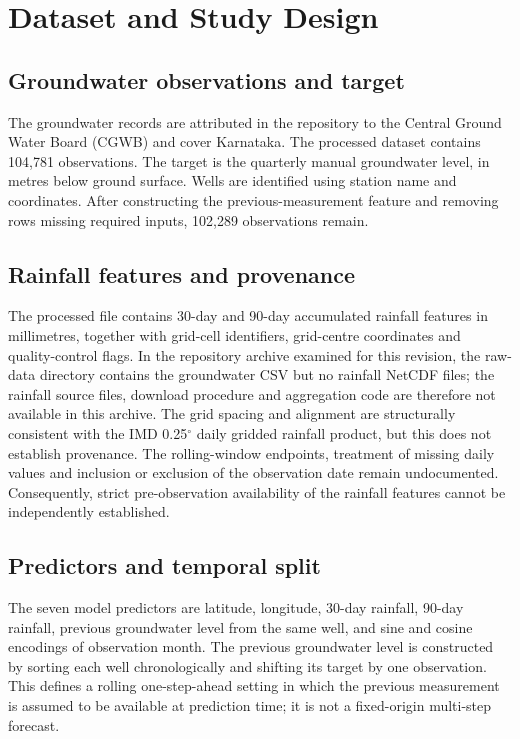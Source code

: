 \documentclass[conference]{IEEEtran}
\begin{document}
\section{Dataset and Study Design}
\subsection{Groundwater observations and target}
The groundwater records are attributed in the repository to the Central Ground Water Board (CGWB) and cover Karnataka. The processed dataset contains 104,781 observations. The target is the quarterly manual groundwater level, in metres below ground surface. Wells are identified using station name and coordinates. After constructing the previous-measurement feature and removing rows missing required inputs, 102,289 observations remain.

\subsection{Rainfall features and provenance}
The processed file contains 30-day and 90-day accumulated rainfall features in millimetres, together with grid-cell identifiers, grid-centre coordinates and quality-control flags. In the repository archive examined for this revision, the raw-data directory contains the groundwater CSV but no rainfall NetCDF files; the rainfall source files, download procedure and aggregation code are therefore not available in this archive. The grid spacing and alignment are structurally consistent with the IMD 0.25$^\circ$ daily gridded rainfall product, but this does not establish provenance. The rolling-window endpoints, treatment of missing daily values and inclusion or exclusion of the observation date remain undocumented. Consequently, strict pre-observation availability of the rainfall features cannot be independently established.

\subsection{Predictors and temporal split}
The seven model predictors are latitude, longitude, 30-day rainfall, 90-day rainfall, previous groundwater level from the same well, and sine and cosine encodings of observation month. The previous groundwater level is constructed by sorting each well chronologically and shifting its target by one observation. This defines a rolling one-step-ahead setting in which the previous measurement is assumed to be available at prediction time; it is not a fixed-origin multi-step forecast.
\end{document}
